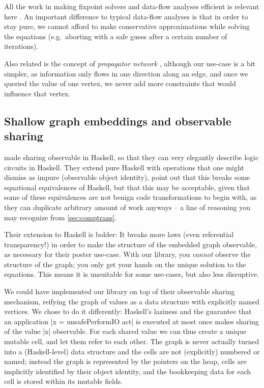 \documentclass[manuscript,review,screen,acmsmall]{acmart}
\begin{document}
All the work in making fixpoint solvers and data-flow analyses efficient is relevant here \citep{kildall-73,kam-ullman-76}. An important difference to typical data-flow analyses is that in order to stay pure, we cannot afford to make conservative approximations while solving the equations (e.g.\ aborting with a safe guess after a certain number of iterations).

Also related is the concept of \emph{propagator network} \citep{propagator}, although our use-case is a bit simpler, as information only flows in one direction along an edge, and once we queried the value of one vertex, we never add more constraints that would influence that vertex.

%

\subsection{Shallow graph embeddings and observable sharing}

 made sharing observable in Haskell, so that they can very elegantly describe logic circuits in Haskell. They extend pure Haskell with operations that one might dismiss as impure (observable object identity), point out that this breaks some equational equivalences of Haskell, but that this may be acceptable, given that some of these equivalences  are not benign code transformations to begin with, as they can duplicate arbitrary amount of work anyways -- a line of reasoning you may recognize from \cref{sec:comptrans}.

Their extension to Haskell is bolder: It breaks more laws (even referential transparency!) in order to make the structure of the embedded graph observable, as necessary for their poster use-case. With our library, you \emph{cannot} observe the structure of the graph; you only get your hands on the unique solution to the equations. This means it is unsuitable for some use-cases, but also less disruptive.

We could have implemented our library on top of their observable sharing mechanism, reifying the graph of values as a data structure with explicitly named vertices. We chose to do it differently: Haskell's laziness and the guarantee that an application |x = unsafePerformIO act| is executed at most once makes sharing of the value |x| observable. For each shared value we can thus create a unique mutable cell, and let them refer to each other.
The graph is never actually turned into a (Haskell-level) data structure and the cells are not (explicitly) numbered or named; instead the graph is represented by the pointers on the heap, cells are implicitly identified by their object identity, and the bookkeeping data for each cell is stored within its mutable fields.
\end{document}
